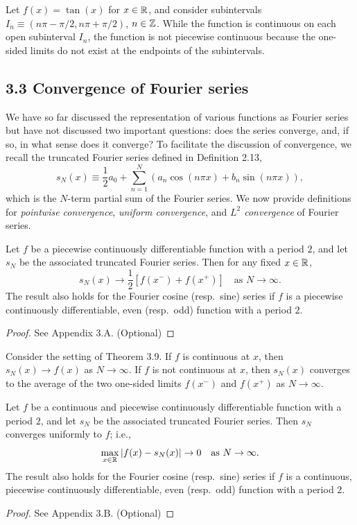 \begin{example}[][3.8]
    Let $f(x) = \tan(x)$ for $x \in \mathbb{R}$, and consider subintervals $I_n \equiv (n\pi - \pi/2, n\pi + \pi/2)$, $n \in \mathbb{Z}$. While the function is continuous on each open subinterval $I_n$, the function is not piecewise continuous because the one-sided limits do not exist at the endpoints of the subintervals.
\end{example}

\subsection{3.3 Convergence of Fourier series}
We have so far discussed the representation of various functions as Fourier series but have not discussed two important questions: does the series converge, and, if so, in what sense does it converge? To facilitate the discussion of convergence, we recall the truncated Fourier series defined in Definition 2.13,
\[s_N(x) \equiv \frac{1}{2} a_0 + \sum_{n=1}^{N} \left(a_n \cos(n\pi x) + b_n \sin(n\pi x)\right),\]
which is the $N$-term partial sum of the Fourier series. We now provide definitions for \textit{pointwise convergence}, \textit{uniform convergence}, and \textit{$L^2$ convergence} of Fourier series.

\begin{theorem}
    Let $f$ be a piecewise continuously differentiable function with a period $2$, and let $s_N$ be the associated truncated Fourier series. Then for any fixed $x \in \mathbb{R}$,
    \[s_N(x) \to \frac{1}{2} [f(x^-) + f(x^+)] \quad \text{as } N \to \infty.\]
    The result also holds for the Fourier cosine (resp.\ sine) series if $f$ is a piecewise continuously differentiable, even (resp.\ odd) function with a period $2$.
\end{theorem}
\begin{proof}
    See Appendix 3.A. (Optional)
\end{proof}

\begin{corollary}[][3.10]
    Consider the setting of Theorem 3.9. If $f$ is continuous at $x$, then $s_N(x) \to f(x)$ as $N \to \infty$. If $f$ is not continuous at $x$, then $s_N(x)$ converges to the average of the two one-sided limits $f(x^-)$ and $f(x^+)$ as $N \to \infty$.
\end{corollary}

\begin{theorem}
    Let $f$ be a continuous and piecewise continuously differentiable function with a period $2$, and let $s_N$ be the associated truncated Fourier series. Then $s_N$ converges uniformly to $f$; i.e.,
    \[\max_{x \in \mathbb{R}} |f(x) - s_N(x)| \to 0 \quad \text{as } N \to \infty.\]
    The result also holds for the Fourier cosine (resp.\ sine) series if $f$ is a continuous, piecewise continuously differentiable, even (resp.\ odd) function with a period $2$.
\end{theorem}
\begin{proof}
    See Appendix 3.B. (Optional)
\end{proof}

